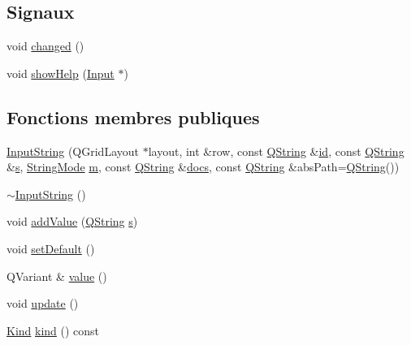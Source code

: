 \subsection*{Signaux}
\begin{DoxyCompactItemize}
\item 
void \hyperlink{class_input_string_a652dc4c0483d77606295f32febcb746b}{changed} ()
\item 
void \hyperlink{class_input_string_a9699d3bf0385d30c100c5cf2fb63012d}{show\+Help} (\hyperlink{class_input}{Input} $\ast$)
\end{DoxyCompactItemize}
\subsection*{Fonctions membres publiques}
\begin{DoxyCompactItemize}
\item 
\hyperlink{class_input_string_adacf356342e5fa2e55f5774364614dab}{Input\+String} (Q\+Grid\+Layout $\ast$layout, int \&row, const \hyperlink{class_q_string}{Q\+String} \&\hyperlink{class_input_string_ae41fde1d4de62d762094778a91d3afe2}{id}, const \hyperlink{class_q_string}{Q\+String} \&\hyperlink{060__command__switch_8tcl_a011c73f2dbb87635a3b4206c72355f6e}{s}, \hyperlink{class_input_string_a7cfa8b8ad573f92ac8a7c850cf63b04b}{String\+Mode} \hyperlink{060__command__switch_8tcl_a78d127e8bda64d4471ac811ad512fbd9}{m}, const \hyperlink{class_q_string}{Q\+String} \&\hyperlink{class_input_string_ae8c833a186bc89fb7c1c62bdeea192ff}{docs}, const \hyperlink{class_q_string}{Q\+String} \&abs\+Path=\hyperlink{class_q_string}{Q\+String}())
\item 
\hyperlink{class_input_string_ab0bf51a9bdba883dd504ae890dc1533a}{$\sim$\+Input\+String} ()
\item 
void \hyperlink{class_input_string_aa8cc8ac64be65a059936950ad1e65ba8}{add\+Value} (\hyperlink{class_q_string}{Q\+String} \hyperlink{060__command__switch_8tcl_a011c73f2dbb87635a3b4206c72355f6e}{s})
\item 
void \hyperlink{class_input_string_a943d2ad1525a07c3b8852de90ac04d00}{set\+Default} ()
\item 
Q\+Variant \& \hyperlink{class_input_string_a9c3a16a3861e950f8790d8c7e157cdc1}{value} ()
\item 
void \hyperlink{class_input_string_a0f19d3ccb9191a54b94e1b290b525742}{update} ()
\item 
\hyperlink{class_input_a4138334795f6330759839617744e20a9}{Kind} \hyperlink{class_input_string_af404b1b40894f7c4dd35239be66edca6}{kind} () const 

\end{DoxyCompactItemize}
